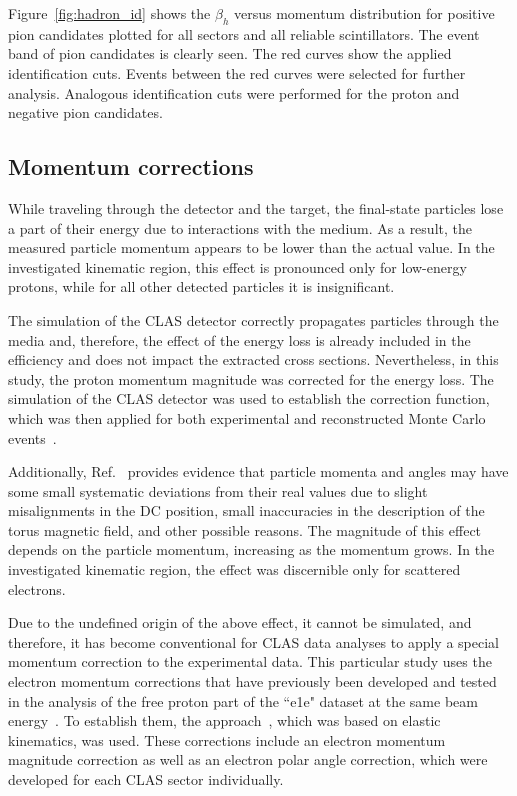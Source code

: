 \documentclass[prc,twocolumn,superscriptaddress,showpacs,amssymb,amsmath,amsfonts,aps,nofootinbib]{revtex4-1}
\begin{document}
Figure~\ref{fig:hadron_id} shows the $\beta_{h}$ versus momentum distribution for positive pion candidates plotted for all sectors and all reliable scintillators. The event band of pion candidates is clearly seen. The red curves show the applied identification cuts. Events between the red curves were selected for further analysis. Analogous identification cuts were performed for the proton and negative pion candidates.





\subsection{Momentum corrections}

While traveling through the detector and the target, the final-state particles lose a part of their energy due to interactions with the medium. As a result, the measured particle momentum appears to be lower than the actual value. In the investigated kinematic region, this effect is pronounced only for low-energy protons, while for all other detected particles it is insignificant.


The simulation of the CLAS detector correctly propagates particles through the media and, therefore, the effect of the energy loss is already included in the efficiency and does not impact the extracted cross sections. Nevertheless, in this study, the proton momentum magnitude was corrected for the energy loss. The simulation of the CLAS detector was used to establish the correction function, which was then applied for both experimental and reconstructed Monte Carlo events~\cite{my_an_note:2020, my_thesis:2021}.

Additionally, Ref.\!~\cite{KPark:momcorr} provides evidence that particle momenta and angles may have some small systematic deviations from their real values due to slight misalignments in the DC position, small inaccuracies in the description of the torus magnetic field, and other possible reasons. The magnitude of this effect depends on the particle momentum, increasing as the momentum grows. In the investigated kinematic region, the effect was discernible only for scattered electrons. 

Due to the undefined origin of the above effect, it cannot be simulated, and therefore, it has become conventional for CLAS data analyses to apply a special momentum correction to the experimental data. This particular study uses the electron momentum corrections that have previously been developed and tested in the analysis of the free proton part of the ``e1e" dataset at the same beam energy~\cite{Fed_an_note:2017,Fed_paper_2018}. To establish them, the approach~\cite{KPark:momcorr}, which was based on elastic kinematics, was used. These corrections include an electron momentum magnitude correction as well as an electron polar angle correction, which were developed for each CLAS sector individually.  
\end{document}
